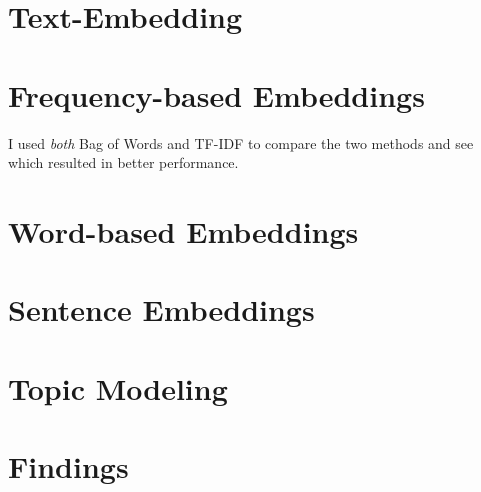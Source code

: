 \documentclass[12pt]{article}
\begin{document}
\section*{Text-Embedding}

\section{Frequency-based Embeddings}

I used \textit{both} Bag of Words and TF-IDF to compare the two methods and see which resulted 
in better performance.

\section{Word-based Embeddings}

\section{Sentence Embeddings}

\section*{Topic Modeling}

\section*{Findings}
\end{document}

